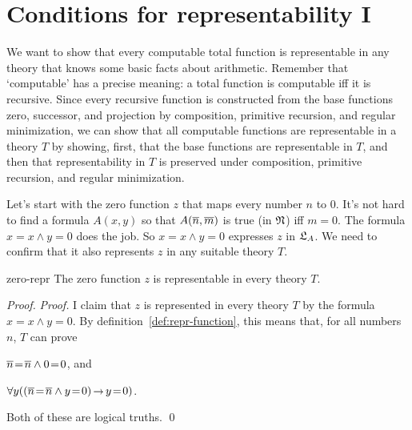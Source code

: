 
\section{Conditions for representability I}

We want to show that every computable total function
is representable in any theory
that knows some basic facts about arithmetic.
Remember that `computable' has a precise meaning:
a total function is computable iff it is recursive.
Since every recursive function
is constructed from
the base functions zero, successor, and projection
by composition, primitive recursion, and regular minimization,
we can show that
all computable functions are representable in a theory $T$
by showing, first, that
the base functions are representable in $T$,
and then that
representability in $T$ is preserved
under composition, primitive recursion, and regular minimization.


Let's start with the zero function $z$
that maps every number $n$ to $0$.
It's not hard to find a formula $A(x,y)$
so that $A(\overline{n},\overline{m})$ is true (in $\mathfrak{N}$) iff $m = 0$.
The formula $x\!=\!x \land y\!=\!0$ does the job.
So $x\!=\!x \land y\!=\!0$ expresses $z$ in $\mathfrak{L}_{A}$.
We need to confirm that it also represents $z$ in any suitable theory $T$.

\begin{lemma}{}{zero-repr}
  The zero function $z$ is representable in every theory $T$.
\end{lemma}

\begin{proof}
  \emph{Proof.}
  I claim that $z$ is represented in every theory $T$
  by the formula $x\!=\!x \land y\!=\!0$.
  By definition~\ref{def:repr-function},
  this means that, for
  all numbers $n$,
  $T$ can prove
  \begin{cenumerate}
    \item[(i)] $\overline{n}\!=\!\overline{n} \land 0\!=\!0$, and
    \item[(ii)] $\forall y((\num{n}\!=\!\num{n} \land y\!=\!0) \to y \!=\! 0)$.
  \end{cenumerate}
  Both of these are logical truths. \qed
\end{proof}

